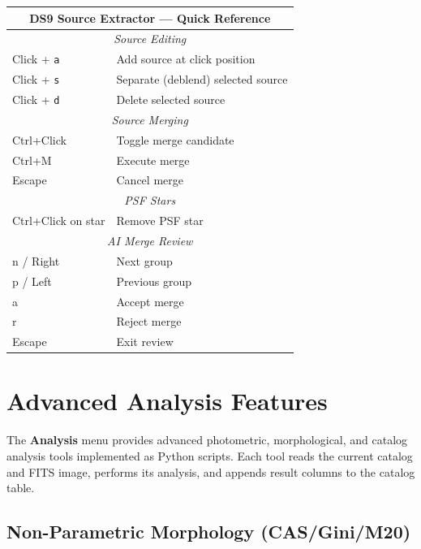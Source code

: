 \documentclass[11pt,fleqn]{book}
\begin{document}
\begin{center}
\begin{tabular}{|l|l|}
\hline
\multicolumn{2}{|c|}{\textbf{DS9 Source Extractor --- Quick Reference}} \\
\hline
\hline
\multicolumn{2}{|c|}{\textit{Source Editing}} \\
\hline
Click + \texttt{a} & Add source at click position \\
Click + \texttt{s} & Separate (deblend) selected source \\
Click + \texttt{d} & Delete selected source \\
\hline
\multicolumn{2}{|c|}{\textit{Source Merging}} \\
\hline
Ctrl+Click & Toggle merge candidate \\
Ctrl+M & Execute merge \\
Escape & Cancel merge \\
\hline
\multicolumn{2}{|c|}{\textit{PSF Stars}} \\
\hline
Ctrl+Click on star & Remove PSF star \\
\hline
\multicolumn{2}{|c|}{\textit{AI Merge Review}} \\
\hline
n / Right & Next group \\
p / Left & Previous group \\
a & Accept merge \\
r & Reject merge \\
Escape & Exit review \\
\hline
\end{tabular}
\end{center}


\chapter{Advanced Analysis Features}
\label{ch:analysis}

The \textbf{Analysis} menu provides advanced photometric, morphological, and catalog analysis tools implemented as Python scripts. Each tool reads the current catalog and FITS image, performs its analysis, and appends result columns to the catalog table.

\section{Non-Parametric Morphology (CAS/Gini/M20)}
\end{document}
